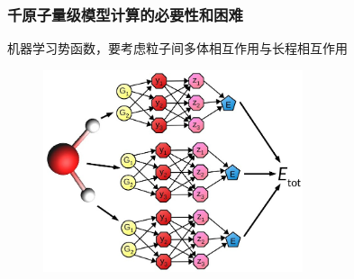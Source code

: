 \begin{frame}
	\frametitle{千原子量级模型计算的必要性和困难}
	机器学习势函数，要考虑粒子间多体相互作用与长程相互作用
\begin{figure}[h!]
\vspace*{-0.05in}
\includegraphics[height=2.34in,width=3.00in]{Figures/MLP_GNN.jpg}
\label{Multi-Scale-4}
\end{figure}
\end{frame}

